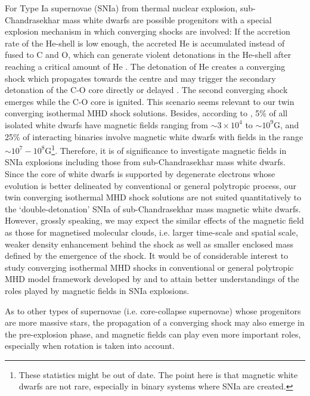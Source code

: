 \documentclass[fleqn,usenatbib]{mnras}
\begin{document}
For Type Ia supernovae (SNIa) from thermal nuclear explosion, sub-Chandrasekhar mass white dwarfs are possible progenitors with a special explosion mechanism in which converging shocks are involved: If the accretion rate of the He-shell is low enough, the accreted He is accumulated instead of fused to C and O, which can generate violent detonations in the He-shell after reaching a critical amount of He \citep{fink2007double}. The detonation of He creates a converging shock which propagates towards the centre and may trigger the secondary detonation of the C-O core directly or delayed \citep{fink2010double}. The second converging shock emerges while the C-O core is ignited.
This scenario seems relevant to our twin converging isothermal MHD shock solutions. Besides, according to \citet{wickramasinghe2000magnetism}, 5\%
of all isolated white dwarfs have magnetic fields ranging from $\sim 3\times 10^{4}$ to $\sim 10^{9}$G, and 25\% of interacting binaries involve magnetic white dwarfs with fields in the range $\sim 10^{7}-10^{8}$G\footnote{These statistics might be out of date. The point here is that magnetic white dwarfs are not rare, especially in binary systems where SNIa are created.}. Therefore, it is of significance to investigate magnetic fields in SNIa explosions including those from sub-Chandrasekhar mass white dwarfs. Since the core of white dwarfs is supported by degenerate electrons whose evolution is better delineated by conventional or general polytropic process, our twin converging isothermal MHD shock solutions are not suited quantitatively to the `double-detonation' SNIa of sub-Chandrasekhar mass magnetic white dwarfs.  However, grossly speaking, we may expect the similar effects of the magnetic field as those for magnetised molecular clouds, i.e. larger time-scale and spatial scale, weaker density enhancement behind the shock as well as smaller enclosed mass defined by the emergence of the shock. It would be of considerable interest to study converging isothermal MHD shocks in conventional or general polytropic MHD model framework developed by \citet{wang2008dynamic} and \citep{lou2010general} to attain better understandings of the roles played by magnetic fields in SNIa explosions.


As to other types of supernovae (i.e. core-collapse supernovae) whose progenitors are more massive stars, the propagation of a converging shock may also emerge in the pre-explosion phase, and magnetic fields can play even more important roles, especially when rotation is taken into account. 
\end{document}
